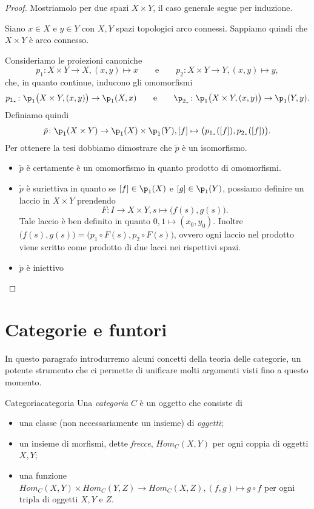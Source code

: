 \begin{proof}
	Mostriamolo per due spazi \(X \times Y\), il caso generale segue per induzione.

	Siano \(x\in X\) e \(y \in Y\) con \(X,Y\) spazi topologici arco connessi.
	Sappiamo quindi che \(X\times Y\) è arco connesso.

	Consideriamo le proiezioni canoniche
	\[
		p_1 \colon X \times Y \to X, (x,y) \mapsto x \qquad\text{e}\qquad p_2 \colon X \times Y \to Y, (x,y) \mapsto y,
	\]
	che, in quanto continue, inducono gli omomorfismi
	\[
		p_{1_*}\colon \p_1 \big(X \times Y, (x,y)\big) \to \p_1(X,x) \qquad\text{e}\qquad \p_{2_*} \colon \p_1\big(X \times Y, (x,y)\big) \to \p_1(Y,y).
	\]
	Definiamo quindi
	\[
		\tilde{p} \colon \p_1(X \times Y) \to \p_1(X) \times \p_1(Y), [f] \mapsto\big(p_{1_*}([f]),p_{2_*}([f])\big).
	\]
	Per ottenere la tesi dobbiamo dimostrare che \(\tilde{p}\) è un isomorfismo.
	\begin{itemize}
		\item \(\tilde{p}\) è certamente è un omomorfismo in quanto prodotto di omomorfismi.
		\item \(\tilde{p}\) è suriettiva in quanto se \([f]\in \p_1(X)\) e \([g]\in \p_1(Y)\), possiamo definire un laccio in \(X\times Y\) prendendo
		      \[
			      F\colon I \to X \times Y, s \mapsto \big(f(s),g(s)\big).
		      \]
		      Tale laccio è ben definito in quanto \(0,1\mapsto (x_0,y_0)\).
		      Inoltre \(\big(f(s),g(s)\big) = \big(p_1\circ F(s), p_2 \circ F(s)\big)\), ovvero ogni laccio nel prodotto viene scritto come prodotto di due lacci nei rispettivi spazi.
		\item \(\tilde{p}\) è iniettivo %
	\end{itemize}
\end{proof}
\section{Categorie e funtori}

In questo paragrafo introdurremo alcuni concetti della teoria delle categorie, un potente strumento che ci permette di unificare molti argomenti visti fino a questo momento.

\begin{defn}{Categoria}{categoria}
	Una \emph{categoria} \(C\) è un oggetto che consiste di
	\begin{itemize}
		\item una classe (non necessariamente un insieme) di \emph{oggetti};
		\item un insieme di morfismi, dette \emph{frecce}, \(Hom_C(X,Y)\) per ogni coppia di oggetti \(X,Y\);
		\item una funzione \(Hom_C(X,Y) \times Hom_C(Y,Z) \to Hom_C(X,Z), (f,g) \mapsto g\circ f\) per ogni tripla di oggetti \(X,Y\) e \(Z\).
	\end{itemize}
\end{defn}

